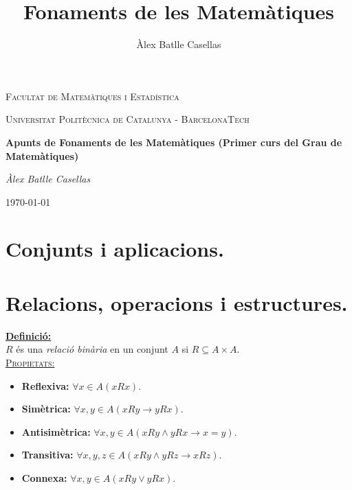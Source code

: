 \documentclass[11pt]{article}
\title{Fonaments de les Matemàtiques}
\author{Àlex Batlle Casellas}
\newcommand{\propietats}{\underline{{\scshape Propietats:}}}
\newcommand{\definicio}{\underline{\textbf{Definició:}}\\}
\begin{document}
\begin{titlepage}
	\centering
	{\scshape\LARGE Facultat de Matemàtiques i Estadística \par}
	\vspace{1cm}
	{\scshape\Large Universitat Politècnica de Catalunya - BarcelonaTech\par}
	\vspace{1.5cm}
	{\huge\bfseries Apunts de Fonaments de les Matemàtiques (Primer curs del Grau de Matemàtiques)
	\par}
	\vspace{2cm}
	{\Large\itshape Àlex Batlle Casellas\par}

	\vfill

	{\large \today\par}
\end{titlepage}


\vfill
\newpage

\tableofcontents
\newpage
\section{}
\section{Conjunts i aplicacions.}
\section{Relacions, operacions i estructures.}
\definicio $R$ és una \textit{relació binària} en un conjunt $A$ si $R\subseteq A\times A$. \\
\propietats \begin{itemize}
	\item \textbf{Reflexiva:} $\forall x\in A (xRx)$.
	\item \textbf{Simètrica:} $\forall x,y\in A (xRy \rightarrow yRx)$.
	\item \textbf{Antisimètrica:} $\forall x,y\in A (xRy\wedge yRx\rightarrow x=y)$.
	\item \textbf{Transitiva:} $\forall x,y,z\in A (xRy\wedge yRz\rightarrow xRz)$.
	\item \textbf{Connexa:} $\forall x,y\in A (xRy\vee yRx)$.
\end{itemize}
\end{document}
